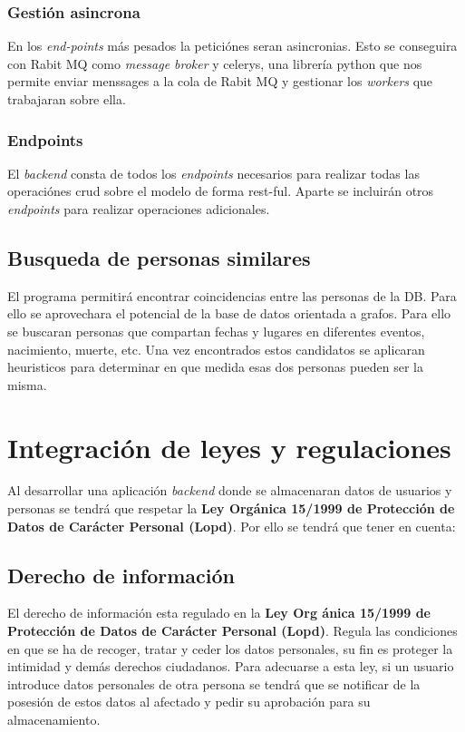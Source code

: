 \documentclass[12pt]{article} %
\begin{document}
\subsubsection*{Gestión asincrona}
En los \textit{end-points} más pesados la peticiónes seran asincronias. Esto se conseguira con Rabit MQ como \textit{message broker} y celerys, una librería python que nos permite enviar menssages a la cola de Rabit MQ y gestionar los \textit{workers} que trabajaran sobre ella.

\subsubsection*{Endpoints}
El \textit{backend} consta de todos los \textit{endpoints} necesarios para realizar todas las operaciónes crud sobre el modelo de forma rest-ful. Aparte se incluirán otros \textit{endpoints} para realizar operaciones adicionales.

\subsection{Busqueda de personas similares}
El programa permitirá encontrar coincidencias entre las personas de la DB. Para ello se aprovechara el potencial de la base de datos orientada a grafos. Para ello se buscaran personas que compartan fechas y lugares en diferentes eventos, nacimiento, muerte, etc. Una vez encontrados estos candidatos se aplicaran heuristicos para determinar en que medida esas dos personas pueden ser la misma.


\section{Integración de leyes y regulaciones}
Al desarrollar una aplicación \textit{backend} donde se almacenaran datos de usuarios y personas se tendrá que respetar la \textbf{Ley Orgánica 15/1999 de Protección de Datos de Carácter Personal (Lopd)}. Por ello se tendrá que tener en cuenta:

\subsection{Derecho de información}
El derecho de información esta regulado en la \textbf{Ley Org
ánica 15/1999 de Protección de Datos de Carácter Personal (Lopd)}. Regula las condiciones en que se ha  de recoger, tratar y ceder los datos personales, su fin es proteger la intimidad y demás derechos ciudadanos. Para adecuarse a esta ley, si un usuario introduce datos personales de otra persona se tendrá que se notificar de la posesión de estos datos al afectado y pedir su aprobación para su almacenamiento.
\end{document}
